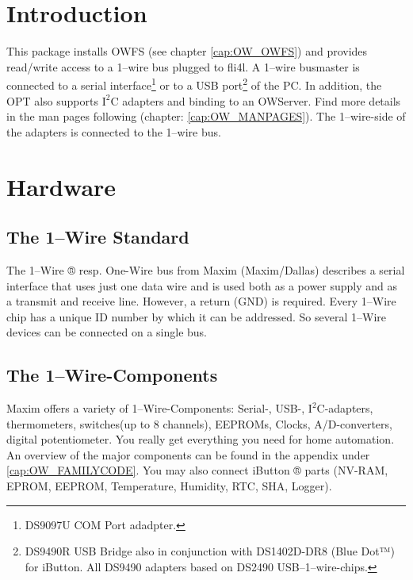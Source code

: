 
\setcounter{secnumdepth}{6}

\newcommand{\IsqC}{$\textrm{I}^{\textrm{2}}\textrm{C}$}
\newcommand{\isqc}{$\textrm{i}^{\textrm{2}}\textrm{c}$}

\section{Introduction}

This package installs OWFS (see chapter \ref{cap:OW_OWFS}) and provides read/write
access to a 1--wire bus plugged to fli4l. A 1--wire busmaster is connected to a serial
interface\footnote{DS9097U COM Port adadpter.} or to a USB port\footnote{DS9490R USB Bridge
also in conjunction with DS1402D-DR8 (Blue Dot™) for iButton. All DS9490 adapters based on
DS2490 USB--1--wire-chips.} of the PC.
In addition, the OPT also supports \IsqC{} adapters and binding to
an OWServer. Find more details in the man pages following (chapter:
\ref{cap:OW_MANPAGES}). The 1--wire-side of the adapters is connected to the 1--wire bus.

\section{Hardware}
\subsection{The 1--Wire Standard}
The 1--Wire ® resp. One-Wire bus from Maxim (Maxim/Dallas) describes a serial interface
that uses just one data wire and is used both as a power supply and as a transmit and
receive line. However, a \glqq{}return\grqq{} (GND) is required. Every 1--Wire chip has
a unique ID number by which it can be addressed. So several 1--Wire devices can be
connected on a single bus.

\subsection{The 1--Wire-Components}
Maxim offers a variety of 1--Wire-Components: Serial-, USB-,
\IsqC-adapters, thermometers, switches(up to 8 channels), EEPROMs, Clocks, A/D-converters,
digital potentiometer. You really get everything you need for home automation.
An overview of the major components can be found in the appendix
under \ref{cap:OW_FAMILYCODE}.
You may also connect iButton ® parts (NV-RAM, EPROM, EEPROM, Temperature,
Humidity, RTC, SHA, Logger).

